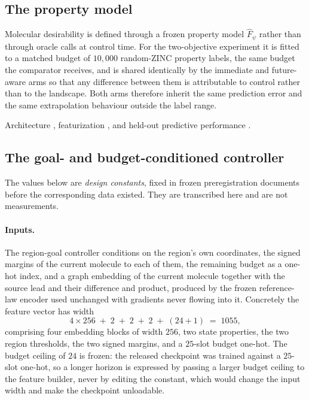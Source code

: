 \subsection{The property model}
\label{app:models-fpsi}

Molecular desirability is defined through a frozen property model $\widehat F_\psi$ rather than through oracle calls at control time. For the two-objective experiment it is fitted to a matched budget of $10{,}000$ random-ZINC property labels, the same budget the comparator receives, and is shared identically by the immediate and future-aware arms so that any difference between them is attributable to control rather than to the landscape. Both arms therefore inherit the same prediction error and the same extrapolation behaviour outside the label range.

Architecture \XXX{}, featurization \XXX{}, and held-out predictive performance \XXX{}.

\subsection{The goal- and budget-conditioned controller}
\label{app:controller}

The values below are \emph{design constants}, fixed in frozen preregistration documents before the corresponding data existed. They are transcribed here and are not measurements.

\paragraph{Inputs.}
The region-goal controller conditions on the region's own coordinates, the signed margins of the current molecule to each of them, the remaining budget as a one-hot index, and a graph embedding of the current molecule together with the source lead and their difference and product, produced by the frozen reference-law encoder used unchanged with gradients never flowing into it. Concretely the feature vector has width
\begin{equation*}
4\times 256 \;+\; 2 \;+\; 2 \;+\; 2 \;+\; (24+1) \;=\; 1055,
\end{equation*}
comprising four embedding blocks of width $256$, two state properties, the two region thresholds, the two signed margins, and a $25$-slot budget one-hot. The budget ceiling of $24$ is frozen: the released checkpoint was trained against a $25$-slot one-hot, so a longer horizon is expressed by passing a larger budget ceiling to the feature builder, never by editing the constant, which would change the input width and make the checkpoint unloadable.

